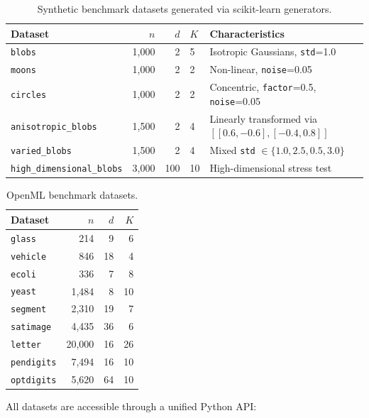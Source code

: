 \documentclass[twoside,11pt]{article}
\begin{document}
\begin{table}[t!]
\centering
\caption{Synthetic benchmark datasets generated via scikit-learn generators.}
\label{tab:synthetic-datasets}
\begin{tabular}{lrrlp{5cm}}
\toprule
Dataset & $n$ & $d$ & $K$ & Characteristics \\
\midrule
\texttt{blobs}               & 1{,}000 & 2  & 5 & Isotropic Gaussians, \texttt{std}=1.0 \\
\texttt{moons}               & 1{,}000 & 2  & 2 & Non-linear, \texttt{noise}=0.05 \\
\texttt{circles}             & 1{,}000 & 2  & 2 & Concentric, \texttt{factor}=0.5, \texttt{noise}=0.05 \\
\texttt{anisotropic\_blobs}  & 1{,}500 & 2  & 4 & Linearly transformed via $[[0.6,-0.6],[-0.4,0.8]]$ \\
\texttt{varied\_blobs}       & 1{,}500 & 2  & 4 & Mixed \texttt{std} $\in\{1.0,2.5,0.5,3.0\}$ \\
\texttt{high\_dimensional\_blobs} & 3{,}000 & 100 & 10 & High-dimensional stress test \\
\bottomrule
\end{tabular}
\end{table}



\begin{table}[t!]
\centering
\caption{OpenML benchmark datasets.}
\label{tab:openml-datasets}
\begin{tabular}{lrrr}
\toprule
Dataset & $n$ & $d$ & $K$ \\
\midrule
\texttt{glass}     & 214      & 9  & 6  \\
\texttt{vehicle}   & 846      & 18 & 4  \\
\texttt{ecoli}     & 336      & 7  & 8  \\
\texttt{yeast}     & 1{,}484  & 8  & 10 \\
\texttt{segment}   & 2{,}310  & 19 & 7  \\
\texttt{satimage}  & 4{,}435  & 36 & 6  \\
\texttt{letter}    & 20{,}000 & 16 & 26 \\
\texttt{pendigits} & 7{,}494  & 16 & 10 \\
\texttt{optdigits} & 5{,}620  & 64 & 10 \\
\bottomrule
\end{tabular}
\end{table}

All datasets are accessible through a unified Python API:
\end{document}
